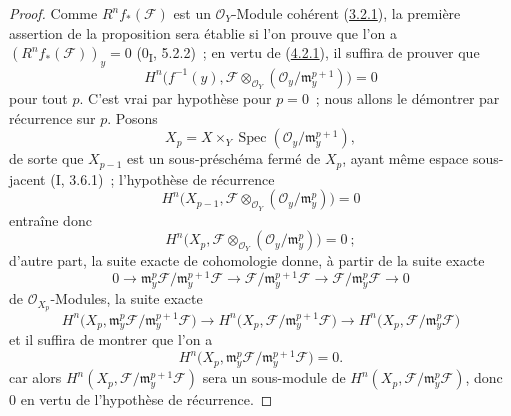 \begin{proof}
Comme $R^nf_*(\mathcal F)$ est un $\mathcal O_Y$-Module cohérent
(\hyperref[III.3.2.1-fr]{3.2.1}), la première assertion de la proposition
sera établie si l'on prouve que l'on a
$(R^nf_*(\mathcal F))_y=0$ (0\textsubscript{I}, 5.2.2)~; en vertu de
(\hyperref[III.4.2.1-fr]{4.2.1}), il suffira de prouver que
\[
H^n\bigl(f^{-1}(y),\mathcal F\otimes_{\mathcal O_Y}
(\mathcal O_y/\mathfrak m_y^{p+1})\bigr)=0
\]
pour tout $p$. C'est vrai par hypothèse pour $p=0$~; nous allons le démontrer
par récurrence sur $p$. Posons
\[
X_p=X\times_Y\operatorname{Spec}
(\mathcal O_y/\mathfrak m_y^{p+1}),
\]
de sorte que $X_{p-1}$ est un sous-préschéma fermé de $X_p$, ayant même
espace sous-jacent (I, 3.6.1)~; l'hypothèse de récurrence
\[
H^n\bigl(X_{p-1},\mathcal F\otimes_{\mathcal O_Y}
(\mathcal O_y/\mathfrak m_y^p)\bigr)=0
\]
entraîne donc
\[
H^n\bigl(X_p,\mathcal F\otimes_{\mathcal O_Y}
(\mathcal O_y/\mathfrak m_y^p)\bigr)=0~;
\]
d'autre part, la suite exacte de cohomologie donne, à partir de la suite
exacte
\[
0\longrightarrow
\mathfrak m_y^p\mathcal F/\mathfrak m_y^{p+1}\mathcal F
\longrightarrow
\mathcal F/\mathfrak m_y^{p+1}\mathcal F
\longrightarrow
\mathcal F/\mathfrak m_y^p\mathcal F
\longrightarrow0
\]
de $\mathcal O_{X_p}$-Modules, la suite exacte
\[
H^n\bigl(X_p,
\mathfrak m_y^p\mathcal F/\mathfrak m_y^{p+1}\mathcal F\bigr)
\longrightarrow
H^n\bigl(X_p,\mathcal F/\mathfrak m_y^{p+1}\mathcal F\bigr)
\longrightarrow
H^n\bigl(X_p,\mathcal F/\mathfrak m_y^p\mathcal F\bigr)
\]
et il suffira de montrer que l'on a
\[
\label{III.4.6.1.1-fr}
H^n\bigl(X_p,
\mathfrak m_y^p\mathcal F/\mathfrak m_y^{p+1}\mathcal F\bigr)=0.
\tag{4.6.1.1}
\]
car alors $H^n(X_p,\mathcal F/\mathfrak m_y^{p+1}\mathcal F)$ sera un
sous-module de $H^n(X_p,\mathcal F/\mathfrak m_y^p\mathcal F)$, donc $0$ en
vertu de l'hypothèse de récurrence.



\end{proof}
